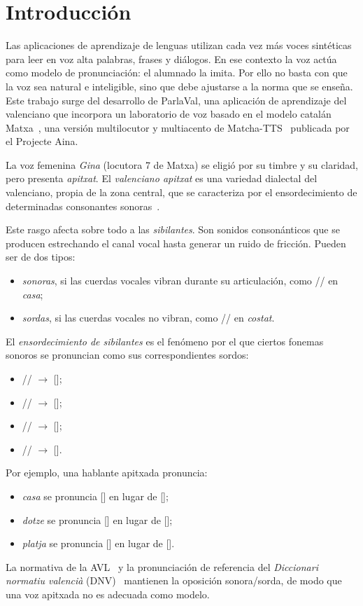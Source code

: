 \documentclass[conference]{IEEEtran}
\newcommand{\fz}{\textipa{z}}
\newcommand{\fdz}{\textipa{dz}}
\newcommand{\fZ}{\textipa{Z}}
\newcommand{\fdZ}{\textipa{dZ}}
\newcommand{\fs}{\textipa{s}}
\newcommand{\fts}{\textipa{ts}}
\newcommand{\fS}{\textipa{S}}
\newcommand{\ftS}{\textipa{tS}}
\begin{document}
\section{Introducción}

Las aplicaciones de aprendizaje de lenguas utilizan cada vez más voces sintéticas para leer en voz alta palabras, frases y diálogos. En ese contexto la voz actúa como modelo de pronunciación: el alumnado la imita. Por ello no basta con que la voz sea natural e inteligible, sino que debe ajustarse a la norma que se enseña. Este trabajo surge del desarrollo de ParlaVal, una aplicación de aprendizaje del valenciano que incorpora un laboratorio de voz basado en el modelo catalán Matxa~\cite{matxa}, una versión multilocutor y multiacento de Matcha-TTS~\cite{mehta2024matcha} publicada por el Projecte Aina.

La voz femenina \textit{Gina} (locutora 7 de Matxa) se eligió por su timbre y su claridad, pero presenta \textit{apitxat}. El \emph{valenciano apitxat} es una variedad dialectal del valenciano, propia de la zona central, que se caracteriza por el ensordecimiento de determinadas consonantes sonoras~\cite{recasens1996}.

Este rasgo afecta sobre todo a las \emph{sibilantes}. Son sonidos consonánticos que se producen estrechando el canal vocal hasta generar un ruido de fricción. Pueden ser de dos tipos:
\begin{itemize}
\item \emph{sonoras}, si las cuerdas vocales vibran durante su articulación, como /\fz/ en \textit{casa};
\item \emph{sordas}, si las cuerdas vocales no vibran, como /\fs/ en \textit{costat}.
\end{itemize}

El \emph{ensordecimiento de sibilantes} es el fenómeno por el que ciertos fonemas sonoros se pronuncian como sus correspondientes sordos:
\begin{itemize}
\item /\fz/ $\rightarrow$ [\fs];
\item /\fdz/ $\rightarrow$ [\fts];
\item /\fZ/ $\rightarrow$ [\fS];
\item /\fdZ/ $\rightarrow$ [\ftS].
\end{itemize}

Por ejemplo, una hablante apitxada pronuncia:
\begin{itemize}
\item \textit{casa} se pronuncia [] en lugar de [];
\item \textit{dotze} se pronuncia [] en lugar de [];
\item \textit{platja} se pronuncia [] en lugar de [].
\end{itemize}
La normativa de la AVL~\cite{gnv2006} y la pronunciación de referencia del \textit{Diccionari normatiu valencià} (DNV)~\cite{dnv} mantienen la oposición sonora/sorda, de modo que una voz apitxada no es adecuada como modelo.
\end{document}
